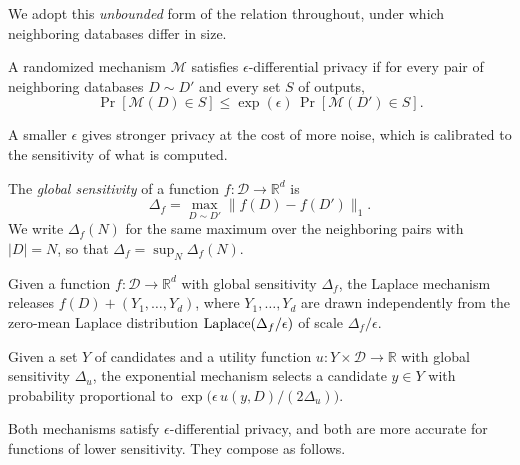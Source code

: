 We adopt this \emph{unbounded} form of the relation throughout, under which neighboring databases differ in size.

\begin{definition}
\label{def:dp}
A randomized mechanism $\mathcal{M}$ satisfies $\epsilon$-differential privacy if for every pair of neighboring databases $D\sim D'$ and every set $S$ of outputs,
\[
\Pr[\mathcal{M}(D)\in S]
\leq
\exp(\epsilon)\,
\Pr[\mathcal{M}(D')\in S].
\]
\end{definition}

A smaller $\epsilon$ gives stronger privacy at the cost of more noise, which is calibrated to the sensitivity of what is computed.

\begin{definition}
\label{def:global-sensitivity}
The \emph{global sensitivity} of a function $f:\mathcal{D}\rightarrow\mathbb{R}^d$ is
\[
\Delta_f
=
\max_{D\sim D'}
\|f(D)-f(D')\|_1 .
\]
We write $\Delta_f(N)$ for the same maximum over the neighboring pairs with $|D|=N$, so that $\Delta_f=\sup_N\Delta_f(N)$.
\end{definition}

\begin{definition}
\label{def:laplace-mechanism}
Given a function $f:\mathcal{D}\rightarrow\mathbb{R}^d$ with global sensitivity $\Delta_f$, the Laplace mechanism releases $f(D)+\left(Y_1,\ldots,Y_d\right)$, where $Y_1,\ldots,Y_d$ are drawn independently from the zero-mean Laplace distribution $\operatorname{Laplace}(\Delta_f/\epsilon)$ of scale $\Delta_f/\epsilon$.
\end{definition}

\begin{definition}
\label{def:exponential-mechanism}
Given a set $Y$ of candidates and a utility function $u:Y\times \mathcal{D}\rightarrow\mathbb{R}$ with global sensitivity $\Delta_u$, the exponential mechanism selects a candidate $y\in Y$ with probability proportional to $\exp\big(\epsilon\, u(y,D)/(2\Delta_u)\big)$.
\end{definition}

Both mechanisms satisfy $\epsilon$-differential privacy, and both are more accurate for functions of lower sensitivity.
They compose as follows.

